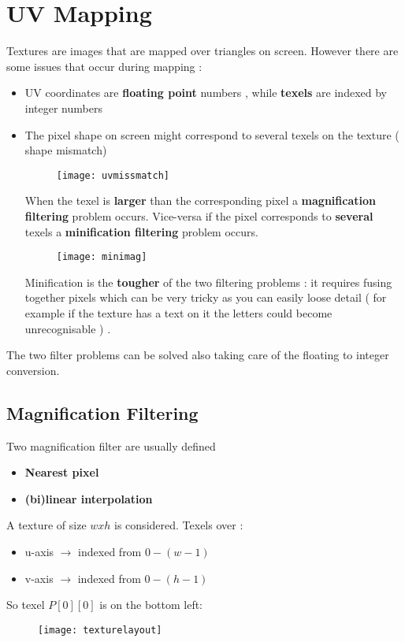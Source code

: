 \newpage
\section{UV Mapping}

Textures are images that are mapped over triangles on screen. However there are some issues that occur during mapping :
\begin{itemize}
\item UV coordinates are \textbf{floating point} numbers , while \textbf{texels} are indexed by integer numbers
\item The pixel shape on screen might correspond to several texels on the texture ( shape mismatch) 
\begin{figure}[H]
 \centering
 \texttt{[image: uvmissmatch]} 
 \end{figure}
 When the texel is \textbf{larger} than the corresponding pixel a \textbf{magnification filtering} problem occurs. Vice-versa if the pixel corresponds to \textbf{several} texels a \textbf{minification filtering} problem occurs.
 \begin{figure}[H]
 \centering
 \texttt{[image: minimag]} 
 \end{figure}
 Minification is the \textbf{tougher} of the two filtering problems : it requires fusing together pixels which can be very tricky as you can easily loose detail ( for example if the texture has a text on it the letters could become unrecognisable ) . 
\end{itemize}
The two filter problems can be solved also taking care of the floating to integer conversion.

\subsection{Magnification Filtering}
Two magnification filter are usually defined 
\begin{itemize}
\item \textbf{Nearest pixel}
\item \textbf{(bi)linear interpolation}
\end{itemize}
A texture of size $wxh$ is considered. Texels over :
\begin{itemize}
\item u-axis $\rightarrow$ indexed from $0 - (w-1)$
\item v-axis $\rightarrow$ indexed from $0 - (h-1)$
\end{itemize}
So texel $P[0][0]$ is on the bottom left:
\begin{figure}[H]
 \centering
 \texttt{[image: texturelayout]} 
 \end{figure}

